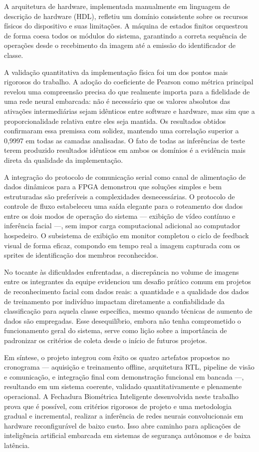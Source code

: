 A arquitetura de hardware, implementada manualmente em linguagem de descrição de hardware (HDL), refletiu um domínio consistente sobre os recursos físicos do dispositivo e suas limitações. A máquina de estados finitos orquestrou de forma coesa todos os módulos do sistema, garantindo a correta sequência de operações desde o recebimento da imagem até a emissão do identificador de classe.

A validação quantitativa da implementação física foi um dos pontos mais rigorosos do trabalho. A adoção do coeficiente de Pearson como métrica principal revelou uma compreensão precisa do que realmente importa para a fidelidade de uma rede neural embarcada: não é necessário que os valores absolutos das ativações intermediárias sejam idênticos entre software e hardware, mas sim que a proporcionalidade relativa entre eles seja mantida. Os resultados obtidos confirmaram essa premissa com solidez, mantendo uma correlação superior a 0,9997 em todas as camadas analisadas. O fato de todas as inferências de teste terem produzido resultados idênticos em ambos os domínios é a evidência mais direta da qualidade da implementação.

A integração do protocolo de comunicação serial como canal de alimentação de dados dinâmicos para a FPGA demonstrou que soluções simples e bem estruturadas são preferíveis a complexidades desnecessárias. O protocolo de controle de fluxo estabeleceu uma saída elegante para o roteamento dos dados entre os dois modos de operação do sistema — exibição de vídeo contínuo e inferência facial —, sem impor carga computacional adicional ao computador hospedeiro. O subsistema de exibição em monitor completou o ciclo de feedback visual de forma eficaz, compondo em tempo real a imagem capturada com os sprites de identificação dos membros reconhecidos.

No tocante às dificuldades enfrentadas, a discrepância no volume de imagens entre os integrantes da equipe evidenciou um desafio prático comum em projetos de reconhecimento facial com dados reais: a quantidade e a qualidade dos dados de treinamento por indivíduo impactam diretamente a confiabilidade da classificação para aquela classe específica, mesmo quando técnicas de aumento de dados são empregadas. Esse desequilíbrio, embora não tenha comprometido o funcionamento geral do sistema, serve como lição sobre a importância de padronizar os critérios de coleta desde o início de futuros projetos.

Em síntese, o projeto integrou com êxito os quatro artefatos propostos no cronograma — aquisição e treinamento offline, arquitetura RTL, pipeline de visão e comunicação, e integração final com demonstração funcional em bancada —, resultando em um sistema coerente, validado quantitativamente e plenamente operacional. A Fechadura Biométrica Inteligente desenvolvida neste trabalho prova que é possível, com critérios rigorosos de projeto e uma metodologia gradual e incremental, realizar a inferência de redes neurais convolucionais em hardware reconfigurável de baixo custo. Isso abre caminho para aplicações de inteligência artificial embarcada em sistemas de segurança autônomos e de baixa latência.
